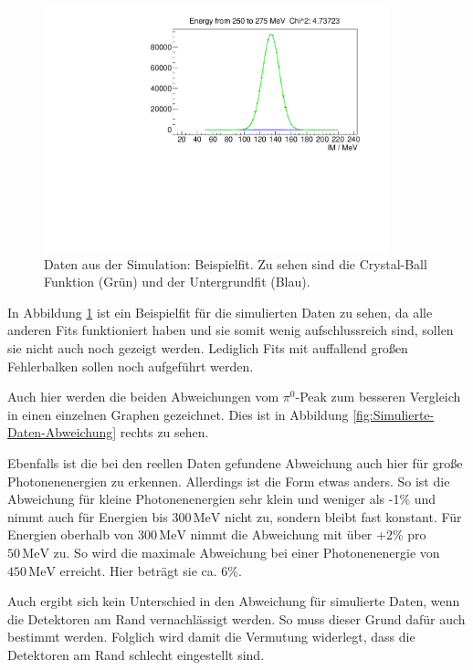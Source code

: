\documentclass[a4paper,11pt,oneside,final,german,openbib,pdftex]{scrbook}
\begin{document}
{\begin{figure}[h!]
	\begin{center}
		\includegraphics[width=100mm]{20170405SimulierteDatenBeispielFit}
		\caption[Simulation: Beispielfit]{Daten aus der Simulation: Beispielfit. Zu sehen sind die Crystal-Ball Funktion (Gr\"un) und der Untergrundfit (Blau).}
		\label{fig:Sim-Beispielfit}
	\end{center}
\end{figure}


In Abbildung \ref{fig:Sim-Beispielfit} ist ein Beispielfit f\"ur die simulierten Daten zu sehen, da alle anderen Fits funktioniert haben und sie somit wenig aufschlussreich sind, sollen sie nicht auch noch gezeigt werden. Lediglich Fits mit auffallend gro{\ss}en Fehlerbalken sollen noch aufgef\"uhrt werden. 

Auch hier werden die beiden Abweichungen vom $\pi^0$-Peak zum besseren Vergleich in einen einzelnen Graphen gezeichnet. Dies ist in Abbildung \ref{fig:Simulierte-Daten-Abweichung} rechts zu sehen.

Ebenfalls ist die bei den reellen Daten gefundene Abweichung auch hier für große Photonenenergien zu erkennen. Allerdings ist die Form etwas anders. So ist die Abweichung f\"ur kleine Photonenenergien sehr klein und weniger als -1\% und nimmt auch f\"ur Energien bis $300\,\text{MeV}$ nicht zu, sondern bleibt fast konstant. F\"ur Energien oberhalb von $300\,\text{MeV}$ nimmt die Abweichung mit \"uber +2\% pro $50\,\text{MeV}$ zu. So wird die maximale Abweichung bei einer Photonenenergie von $450\,\text{MeV}$ erreicht. Hier betr\"agt sie ca. 6\%. 

Auch ergibt sich kein Unterschied in den Abweichung für simulierte Daten, wenn die Detektoren am Rand vernachlässigt werden. So muss dieser Grund dafür auch bestimmt werden. Folglich wird damit die Vermutung widerlegt, dass die Detektoren am Rand schlecht eingestellt sind.


}
\end{document}
